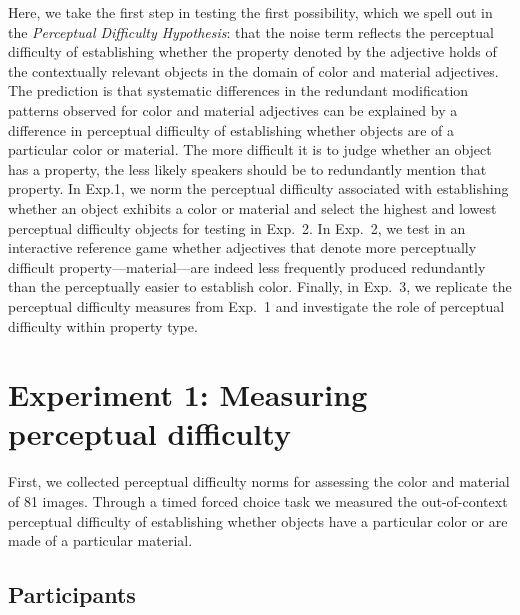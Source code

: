 \documentclass[12pt,letterpaper]{article}
\begin{document}
Here, we take the first step in testing the first possibility, which we spell out in the \emph{Perceptual Difficulty Hypothesis}: that the noise term reflects the perceptual difficulty of establishing whether the property denoted by the adjective holds of the contextually relevant objects in the domain of color and material adjectives. The prediction is that systematic differences in the redundant modification patterns observed for color and material adjectives can be explained by a difference in perceptual difficulty of establishing whether objects are of a particular color or material. The more difficult it is to judge whether an object has a property, the less likely speakers should be to redundantly mention that property. In Exp.1, we norm the perceptual difficulty associated with establishing whether an object exhibits a color or material and select the highest and lowest perceptual difficulty objects  for testing in Exp.~2. In Exp.~2, we test in an interactive reference game whether adjectives that denote more perceptually difficult property---material---are indeed less frequently produced redundantly than the perceptually easier to establish color. Finally, in Exp.~3, we replicate the perceptual difficulty measures from Exp.~1 and investigate the role of perceptual difficulty within property type.


\section{Experiment 1: Measuring perceptual difficulty} 

First, we collected perceptual difficulty norms for assessing the color and material  of 81 images. Through a timed forced choice task we measured the out-of-context perceptual difficulty of establishing whether  objects have a particular color or are made of a particular material.

\subsection{Participants} 
\end{document}
